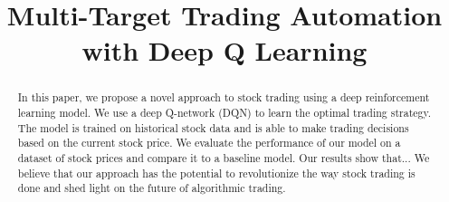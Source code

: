 \documentclass[conference]{IEEEtran}
\begin{document}
\title{Multi-Target Trading Automation with Deep Q Learning}

\author{
\and
{}
\and
{}
\and
{}
\and
{}
\and
{}
}

\maketitle

\begin{abstract}
In this paper, we propose a novel approach to stock trading using a deep reinforcement learning model. We use a deep Q-network (DQN) to learn the optimal trading strategy. The model is trained on historical stock data and is able to make trading decisions based on the current stock price. We evaluate the performance of our model on a dataset of stock prices and compare it to a baseline model. Our results show that... We believe that our approach has the potential to revolutionize the way stock trading is done and shed light on the future of algorithmic trading.
\end{abstract}
\end{document}
